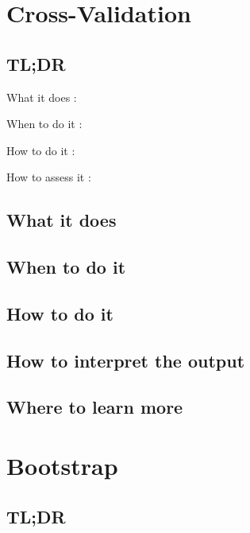 \documentclass[
]{book}
\begin{document}
\hypertarget{cross-validation}{%
\chapter{Cross-Validation}\label{cross-validation}}

\hypertarget{tldr-9}{%
\section{TL;DR}\label{tldr-9}}

What it does
:

When to do it
:

How to do it
:

How to assess it
:

\hypertarget{what-it-does-9}{%
\section{What it does}\label{what-it-does-9}}

\hypertarget{when-to-do-it-9}{%
\section{When to do it}\label{when-to-do-it-9}}

\hypertarget{how-to-do-it-9}{%
\section{How to do it}\label{how-to-do-it-9}}

\hypertarget{how-to-interpret-the-output-9}{%
\section{How to interpret the output}\label{how-to-interpret-the-output-9}}

\hypertarget{where-to-learn-more-9}{%
\section{Where to learn more}\label{where-to-learn-more-9}}

\hypertarget{bootstrap}{%
\chapter{Bootstrap}\label{bootstrap}}

\hypertarget{tldr-10}{%
\section{TL;DR}\label{tldr-10}}
\end{document}
